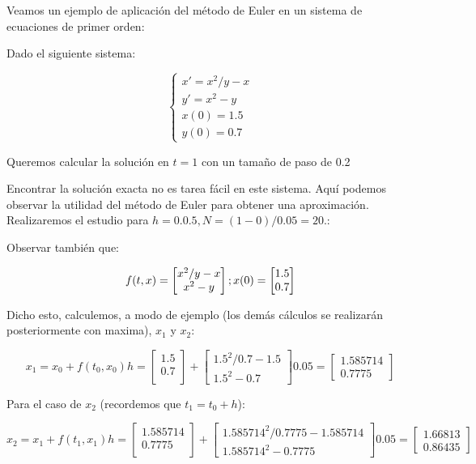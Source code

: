 \documentclass[12pt]{article}       %
\begin{document}
Veamos un ejemplo de aplicación del método de Euler en un sistema de ecuaciones de primer orden:

Dado el siguiente sistema:

$$
\begin{cases}
x' = x^2/y - x\\
y' = x^2-y \\
x(0) = 1.5\\
y(0)=0.7
\end{cases}
$$

Queremos calcular la solución en $t=1$ con un tamaño de paso de 0.2

Encontrar la solución exacta no es tarea fácil en este sistema. Aquí podemos observar la utilidad del método de Euler para obtener una aproximación. Realizaremos el estudio para $h=0.0.5, N=(1-0)/0.05=20$.: 

Observar también que:

\begin{equation*}
f(t,x)=\begin{bmatrix}
 x^2/y-x \\
 x^2-y \\
\end{bmatrix};\\
x(0)=\begin{bmatrix}
1.5 \\
0.7
\end{bmatrix}
\end{equation*}
 
Dicho esto, calculemos, a modo de ejemplo (los demás cálculos se realizarán posteriormente con maxima), $x_1$ y $x_2$:

\begin{equation*}
x_1=x_0+f(t_0,x_0)h=\begin{bmatrix}
1.5\\
0.7\\
\end{bmatrix} + \begin{bmatrix}
1.5^2/0.7 - 1.5\\
1.5^2 - 0.7
\end{bmatrix}0.05=\begin{bmatrix}
1.585714\\
0.7775
\end{bmatrix}  
\end{equation*}

Para el caso de $x_2$ (recordemos que $t_1=t_0+h$):

\begin{equation*}
x_2=x_1+f(t_1,x_1)h=\begin{bmatrix}
1.585714\\
0.7775\\
\end{bmatrix} + \begin{bmatrix}
1.585714^2/0.7775 - 1.585714\\
1.585714^2 - 0.7775
\end{bmatrix}0.05=\begin{bmatrix}
1.66813\\
0.86435
\end{bmatrix}  
\end{equation*}
\end{document}
